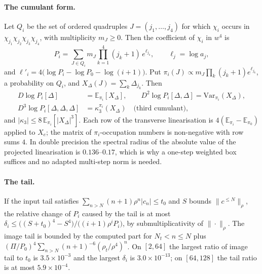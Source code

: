 \documentclass[11pt,a4paper]{article}
\theoremstyle{definition}
\theoremstyle{remark}
\begin{document}
\paragraph{The cumulant form.}
Let $Q_i$ be the set of ordered quadruples $J=(j_1,\dots,j_4)$ for which $\chi_i$ occurs in $\chi_{j_1}\chi_{j_2}\chi_{j_3}\chi_{j_4}$, with multiplicity $m_J\ge0$.
Then the coefficient of $\chi_i$ in $w^4$ is
\[
P_i=\sum_{J\in Q_i}m_J\prod_{k=1}^4(j_k+1)\,e^{\ell_{j_k}},\qquad \ell_j=\log a_j,
\]
and $\ell'_i=4\bigl(\log P_i-\log P_0-\log(i+1)\bigr)$.
Put $\pi_i(J)\propto m_J\prod_k(j_k+1)e^{\ell_{j_k}}$, a probability on $Q_i$, and $X_\Delta(J)=\sum_k\Delta_{j_k}$.
Then
\begin{align*}
D\log P_i[\Delta]&=\mathbb{E}_{\pi_i}[X_\Delta],\qquad D^2\log P_i[\Delta,\Delta]=\mathrm{Var}_{\pi_i}(X_\Delta),\\
D^3\log P_i[\Delta,\Delta,\Delta]&=\kappa_3^{\pi_i}(X_\Delta)\quad\text{(third cumulant)},
\end{align*}
and $|\kappa_3|\le8\,\mathbb{E}_{\pi_i}[|X_\Delta|^3]$.
Each row of the transverse linearisation is $4(\mathbb{E}_{\pi_i}-\mathbb{E}_{\pi_0})$ applied to $X_e$; the matrix of $\pi_i$-occupation numbers is non-negative with row sums $4$.
In double precision the spectral radius of the absolute value of the projected linearisation is $0.136$--$0.17$, which is why a one-step weighted box suffices and no adapted multi-step norm is needed.

\paragraph{The tail.}
If the input tail satisfies $\sum_{n>N}(n+1)\rho^n|c_n|\le t_0$ and $S$ bounds $\|c^{\le N}\|_\rho$, the relative change of $P_i$ caused by the tail is at most $\delta_i\le\bigl((S+t_0)^4-S^4\bigr)/\bigl((i+1)\rho^iP_i\bigr)$, by submultiplicativity of $\|\cdot\|_\rho$.
The image tail is bounded by the computed part for $N_t<n\le N$ plus $(\Pi/P_0)^4\sum_{n>N}(n+1)^{-6}(\rho_t/\rho^4)^n$.
On $[2,64]$ the largest ratio of image tail to $t_0$ is $3.5\times10^{-3}$ and the largest $\delta_i$ is $3.0\times10^{-13}$; on $[64,128]$ the tail ratio is at most $5.9\times10^{-4}$.
\end{document}
